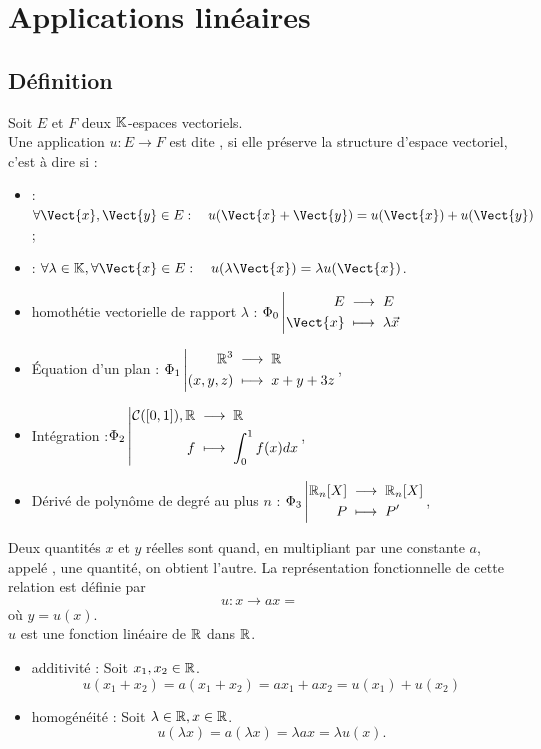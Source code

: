 \documentclass{book}
\begin{document}
\section{Applications linéaires}

\subsection{Définition}



\begin{Definition}
Soit $E$ et $F$ deux $\mathbb{K} $-espaces vectoriels.\\
Une application $u:E\to F$ est dite , si  elle préserve la structure d'espace vectoriel, c'est à dire si :
\begin{itemize}
\item
   : $\forall   \Vect{x},\Vect{y}\in  E:\quad u(\Vect{x}+\Vect{y}) = u(\Vect{x}) + u(\Vect{y})$;
\item
   : $\forall   \lambda \in  \K,\forall   \Vect{x}\in  E:\quad u(\lambda \Vect{x}) = \lambda u(\Vect{x})$.
\end{itemize}
\end{Definition}
\begin{Exemple} 
\begin{itemize}
\item homothétie vectorielle de rapport $\lambda$ : $\Fonction{\Phi _0}{E}{E}{\Vect{x}}{\lambda\vec{x}}$ 
\item Équation d'un plan : ${\Phi _1}\left|\begin{aligned}{\mathbb {R}^3 }&\;\longrightarrow\;{\mathbb {R}}\\{(x,y,z)}&\;\longmapsto\;{x+y+3z}\end{aligned}\right.$,
\item Intégration :${\Phi _2}\left|\begin{aligned}{\mathcal{C}([0,1]),  \mathbb {R} }&\;\longrightarrow\;{\mathbb {R}}\\{f}&\;\longmapsto\;{\int_0^1 f(x)dx}\end{aligned}\right.$,
\item Dérivé de polynôme de degré au plus $n$ : ${\Phi _3}\left|\begin{aligned}{\mathbb {R}_n[X] }&\;\longrightarrow\;{\mathbb {R}_n[X]}\\{P}&\;\longmapsto\;{P'}\end{aligned}\right.$,
\end{itemize}
\end{Exemple}


\begin{DefinitionProposition}
Deux quantités $x$ et $y$ réelles sont  quand, en multipliant par une constante $a$, appelé ,  une quantité, on obtient l'autre. La représentation fonctionnelle  de cette relation est définie par  $$u:x\to ax =$$ où $y=u(x)$.\\
$u$ est une fonction linéaire de $\mathbb{R}$ dans $\mathbb{R}$.
\end{DefinitionProposition}
\begin{Demonstration}
\begin{itemize}
\item additivité : Soit $x_1,x_2\in \mathbb{R}$.\\
$$u(  x_1+x_2)=a(  x_1+x_2)=ax_1+ax_2=u(x_1)+u(x_2)$$
\item homogénéité : Soit $\lambda\in\mathbb{R}, x\in \mathbb{R}$.\\
$$u(\lambda  x)=a( \lambda x)=\lambda a x=\lambda u(x).$$
\end{itemize} 
\end{Demonstration}
\end{document}

